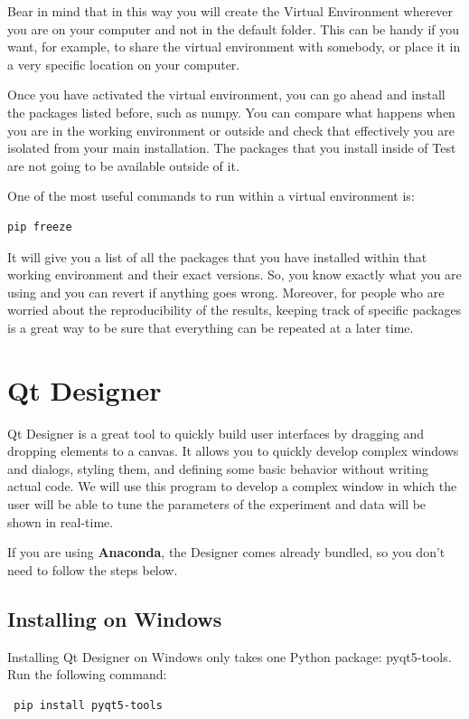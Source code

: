 Bear in mind that in this way you will create the Virtual Environment wherever you are on your computer and not in the default folder. This can be handy if you want, for example, to share the virtual environment with somebody, or place it in a very specific location on your computer.

Once you have activated the virtual environment, you can go ahead and install the packages listed before, such as numpy. You can compare what happens when you are in the working environment or outside and check that effectively you are isolated from your main installation. The packages that you install inside of Test are not going to be available outside of it.

One of the most useful commands to run within a virtual environment is:

\begin{verbatim}
pip freeze
\end{verbatim}

It will give you a list of all the packages that you have installed within that working environment and their exact versions. So, you know exactly what you are using and you can revert if anything goes wrong. Moreover, for people who are worried about the reproducibility of the results, keeping track of specific packages is a great way to be sure that everything can be repeated at a later time.

\section{Qt Designer}
Qt Designer is a great tool to quickly build user interfaces by dragging and dropping elements to a canvas. It allows you to quickly develop complex windows and dialogs, styling them, and defining some basic behavior without writing actual code. We will use this program to develop a complex window in which the user will be able to tune the parameters of the experiment and data will be shown in real-time. 

If you are using \textbf{Anaconda}, the Designer comes already bundled, so you don't need to follow the steps below.

\subsection{Installing on Windows}
Installing Qt Designer on Windows only takes one Python package: pyqt5-tools. Run the following command:

\begin{verbatim}
 pip install pyqt5-tools
\end{verbatim}

